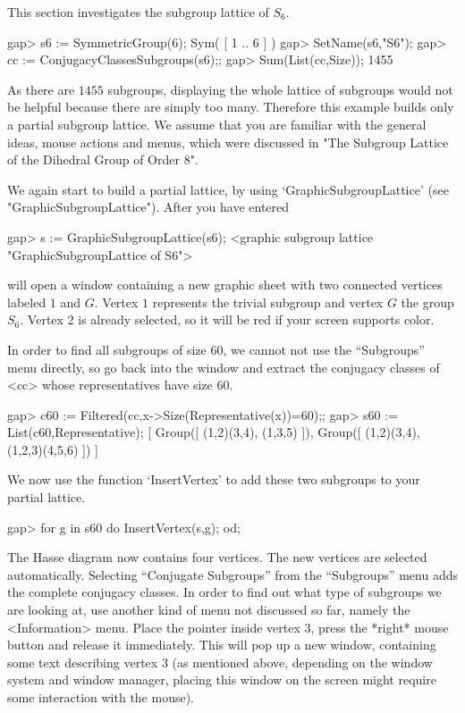 
This section investigates the subgroup lattice of $S_6$.

\begintt
gap> s6 := SymmetricGroup(6);
Sym( [ 1 .. 6 ] )
gap> SetName(s6,"S6");
gap> cc := ConjugacyClassesSubgroups(s6);;
gap> Sum(List(cc,Size));
1455
\endtt

As there are $1455$ subgroups,  displaying  the whole lattice of  subgroups
would not  be helpful because  there are simply  too many.   Therefore this
example builds only a partial  subgroup lattice.   We  assume that you  are
familiar with  the  general ideas,  mouse   actions and  menus, which  were
discussed in "The Subgroup Lattice of the Dihedral Group of Order 8".

We again start to build a partial lattice, by using
`GraphicSubgroupLattice' (see "GraphicSubgroupLattice").  After you have
entered

\begintt
gap> s := GraphicSubgroupLattice(s6);
<graphic subgroup lattice "GraphicSubgroupLattice of S6">
\endtt

{\XGAP}  will open  a window  containing  a new  graphic  sheet with  two
connected vertices   labeled  $1$ and $G$.     Vertex  $1$ represents the
trivial subgroup and  vertex $G$ the group $S_6$.   Vertex $2$ is already
selected, so it will be red if your screen supports color.

In order  to  find all subgroups   of size $60$, we  cannot   not use the
``Subgroups'' menu directly, so go back into the  {\GAP} window and extract
the conjugacy classes of <cc> whose representatives have size $60$.

\begintt
gap> c60 := Filtered(cc,x->Size(Representative(x))=60);;
gap> s60 := List(c60,Representative);
[ Group([ (1,2)(3,4), (1,3,5) ]), Group([ (1,2)(3,4), (1,2,3)(4,5,6) ]) ]
\endtt

We now use the  function `InsertVertex'  to  add  these two subgroups  to your
partial lattice.  

\begintt
gap> for g in s60 do InsertVertex(s,g); od;
\endtt

The Hasse diagram now contains four vertices.
The new vertices are selected automatically.  Selecting ``Conjugate
Subgroups'' from the ``Subgroups'' menu adds the complete conjugacy classes.
In order to find out what type of subgroups we  are looking at, use another
kind of menu not  discussed so far,  namely the <Information>  menu.  Place
the pointer inside  vertex $3$, press the  *right* mouse button and release
it immediately.  This  will  pop  up a new   window,  containing some  text
describing vertex $3$  (as mentioned above,  depending on the window system
and  window manager, placing this  window on the  screen might require some
interaction with the mouse).

